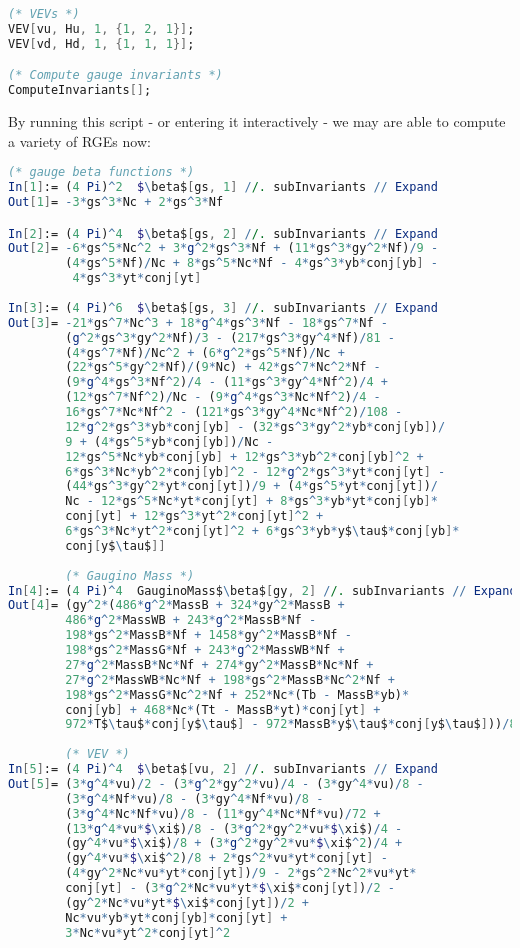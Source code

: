\documentclass{scrartcl}
\begin{document}
\begin{lstlisting}[language=mathematica,mathescape,columns=flexible,backgroundcolor=\color{light-gray}]
(* VEVs *)
VEV[vu, Hu, 1, {1, 2, 1}];
VEV[vd, Hd, 1, {1, 1, 1}];

(* Compute gauge invariants *)
ComputeInvariants[];
\end{lstlisting}
By running this script - or entering it interactively - we may are able to compute a variety of RGEs now:
\begin{lstlisting}[language=mathematica,mathescape,columns=flexible,backgroundcolor=\color{light-gray}]
        (* gauge beta functions *)
In[1]:= (4 Pi)^2  $\beta$[gs, 1] //. subInvariants // Expand
Out[1]= -3*gs^3*Nc + 2*gs^3*Nf

In[2]:= (4 Pi)^4  $\beta$[gs, 2] //. subInvariants // Expand
Out[2]= -6*gs^5*Nc^2 + 3*g^2*gs^3*Nf + (11*gs^3*gy^2*Nf)/9 - 
        (4*gs^5*Nf)/Nc + 8*gs^5*Nc*Nf - 4*gs^3*yb*conj[yb] - 
         4*gs^3*yt*conj[yt]
        
In[3]:= (4 Pi)^6  $\beta$[gs, 3] //. subInvariants // Expand
Out[3]= -21*gs^7*Nc^3 + 18*g^4*gs^3*Nf - 18*gs^7*Nf - 
        (g^2*gs^3*gy^2*Nf)/3 - (217*gs^3*gy^4*Nf)/81 - 
        (4*gs^7*Nf)/Nc^2 + (6*g^2*gs^5*Nf)/Nc + 
        (22*gs^5*gy^2*Nf)/(9*Nc) + 42*gs^7*Nc^2*Nf - 
        (9*g^4*gs^3*Nf^2)/4 - (11*gs^3*gy^4*Nf^2)/4 + 
        (12*gs^7*Nf^2)/Nc - (9*g^4*gs^3*Nc*Nf^2)/4 - 
        16*gs^7*Nc*Nf^2 - (121*gs^3*gy^4*Nc*Nf^2)/108 - 
        12*g^2*gs^3*yb*conj[yb] - (32*gs^3*gy^2*yb*conj[yb])/
        9 + (4*gs^5*yb*conj[yb])/Nc - 
        12*gs^5*Nc*yb*conj[yb] + 12*gs^3*yb^2*conj[yb]^2 + 
        6*gs^3*Nc*yb^2*conj[yb]^2 - 12*g^2*gs^3*yt*conj[yt] - 
        (44*gs^3*gy^2*yt*conj[yt])/9 + (4*gs^5*yt*conj[yt])/
        Nc - 12*gs^5*Nc*yt*conj[yt] + 8*gs^3*yb*yt*conj[yb]*
        conj[yt] + 12*gs^3*yt^2*conj[yt]^2 + 
        6*gs^3*Nc*yt^2*conj[yt]^2 + 6*gs^3*yb*y$\tau$*conj[yb]*
        conj[y$\tau$]]
        
        (* Gaugino Mass *)
In[4]:= (4 Pi)^4  GauginoMass$\beta$[gy, 2] //. subInvariants // Expand
Out[4]= (gy^2*(486*g^2*MassB + 324*gy^2*MassB + 
        486*g^2*MassWB + 243*g^2*MassB*Nf - 
        198*gs^2*MassB*Nf + 1458*gy^2*MassB*Nf - 
        198*gs^2*MassG*Nf + 243*g^2*MassWB*Nf + 
        27*g^2*MassB*Nc*Nf + 274*gy^2*MassB*Nc*Nf + 
        27*g^2*MassWB*Nc*Nf + 198*gs^2*MassB*Nc^2*Nf + 
        198*gs^2*MassG*Nc^2*Nf + 252*Nc*(Tb - MassB*yb)*
        conj[yb] + 468*Nc*(Tt - MassB*yt)*conj[yt] + 
        972*T$\tau$*conj[y$\tau$] - 972*MassB*y$\tau$*conj[y$\tau$]))/81
        
        (* VEV *)
In[5]:= (4 Pi)^4  $\beta$[vu, 2] //. subInvariants // Expand
Out[5]= (3*g^4*vu)/2 - (3*g^2*gy^2*vu)/4 - (3*gy^4*vu)/8 - 
        (3*g^4*Nf*vu)/8 - (3*gy^4*Nf*vu)/8 - 
        (3*g^4*Nc*Nf*vu)/8 - (11*gy^4*Nc*Nf*vu)/72 + 
        (13*g^4*vu*$\xi$)/8 - (3*g^2*gy^2*vu*$\xi$)/4 - 
        (gy^4*vu*$\xi$)/8 + (3*g^2*gy^2*vu*$\xi$^2)/4 + 
        (gy^4*vu*$\xi$^2)/8 + 2*gs^2*vu*yt*conj[yt] - 
        (4*gy^2*Nc*vu*yt*conj[yt])/9 - 2*gs^2*Nc^2*vu*yt*
        conj[yt] - (3*g^2*Nc*vu*yt*$\xi$*conj[yt])/2 - 
        (gy^2*Nc*vu*yt*$\xi$*conj[yt])/2 + 
        Nc*vu*yb*yt*conj[yb]*conj[yt] + 
        3*Nc*vu*yt^2*conj[yt]^2
        

\end{lstlisting}
\end{document}
